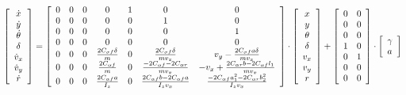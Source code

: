 \documentclass[conference]{IEEEtran}
\begin{document}
\begin{figure}[htbp]
	\begin{equation}
		\left[ \begin{array}{c}
			\dot{x}\\
			\dot{y}\\
			\dot{\theta}\\
			\delta\\
			\dot{v}_x\\
			\dot{v}_y\\
			\dot{r}\\
		\end{array} \right] 
		=
		\left[ \begin{array}{c c c c c c c}
			0&	0&	0 & 0&		1&		0&		0\\
			0&	0&	0 & 0&		0&		1&		0\\
			0&	0&	0 & 0&		0&		0&		1\\
			0&	0&	0 & 0&		0&		0&		0\\
			0&	0&	0 & \frac{2C_{\sigma f}\delta}{m}&	0&	   \frac{2C_{\sigma f}\delta}{mv_x}&		v_y-\frac{2C_{\sigma f}a\delta}{mv_x}\\
			0&	0&	0 & \frac{2C_{\alpha f}}{m}&		   0&		\frac{-2C_{\alpha f}-2C_{\alpha r}}{mv_x}&		-v_x+\frac{2C_{\alpha r}b-2C_{\alpha f}l_1}{mv_x}\\
			0&	0&	0 & \frac{2C_{\alpha f}a}{I_z}&		0&		\frac{2C_{\alpha f}b-2C_{\alpha f}a}{I_zv_x}&		\frac{-2C_{\alpha f}a_{1}^{2}-2C_{\alpha r}b_{2}^{2}}{I_zv_x}\\
		\end{array} \right] 
		\cdot 
		\left[ \begin{array}{c}
			x\\
			y\\
			\theta\\
			\delta\\
			v_x\\
			v_y\\
			r\\
		\end{array} \right]
		+\left[ \begin{array}{c c}
			0&		0\\
			0&		0\\
			0&		0\\
			1&		0\\
			0&		1\\
			0&		0\\
			0&		0\\
		\end{array} \right] 
		\cdot 
		\left[ \begin{array}{l}
			\gamma\\
			a\\
		\end{array} \right] 
	\end{equation}
\end{figure}
\end{document}

